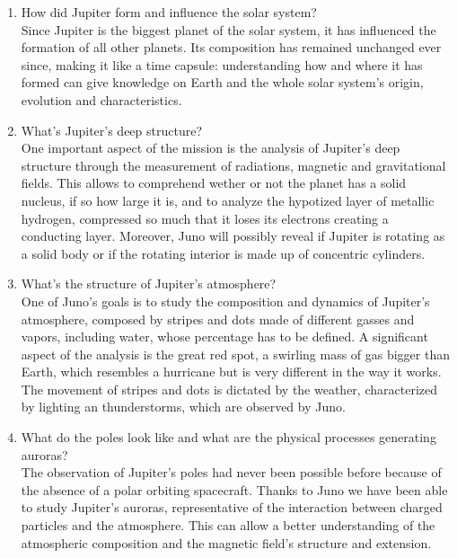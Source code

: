 \begin{enumerate}
    \item How did Jupiter form and influence the solar system? \\
    Since Jupiter is the biggest planet of the solar system, it has influenced the formation of all other planets. Its composition has remained unchanged ever since, making it like a time capsule: understanding how and where it has formed can give knowledge on Earth and the whole solar system’s origin, evolution and characteristics. \\

 
    \item What's Jupiter's deep structure?\\
    One important aspect of the mission is the analysis of Jupiter's deep structure through the measurement of radiations, magnetic and gravitational fields. This allows to comprehend wether or not the planet has a solid nucleus, if so how large it is, and to analyze the hypotized layer of metallic hydrogen, compressed so much that it loses its electrons creating a conducting layer.  Moreover, Juno will possibly reveal if Jupiter is rotating as a solid body or if the rotating interior is made up of concentric cylinders.\\

    \item What's the structure of Jupiter's atmosphere?\\
    One of Juno's goals is to study the composition and dynamics of Jupiter's atmosphere, composed by stripes and dots made of different gasses and vapors, including water, whose percentage has to be defined. A significant aspect of the analysis is the great red spot, a swirling mass of gas bigger than Earth, which resembles a hurricane but is very different in the way it works. The movement of stripes and dots is dictated by the weather, characterized by lighting an thunderstorms, which are observed by Juno. \\

    \item What do the poles look like and what are the physical processes generating auroras?\\
    The observation of Jupiter's poles had never been possible before because of the absence of a polar orbiting spacecraft. Thanks to Juno we have been able to study Jupiter's auroras, representative of the interaction between charged particles and the atmosphere. This can allow a better understanding of the atmospheric composition and the magnetic field's structure and extension.\\




\end{enumerate}


